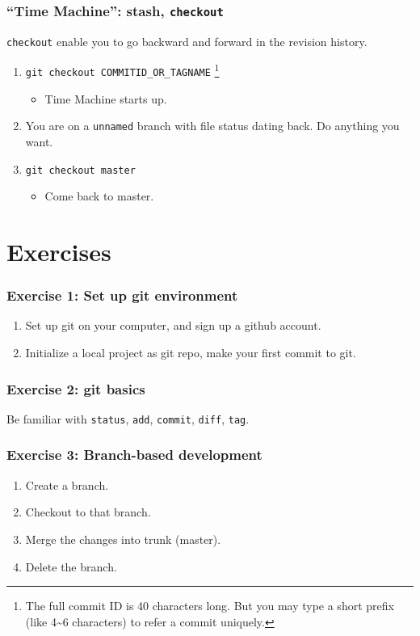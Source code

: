 \documentclass[11pt,ignorenonframetext,]{beamer}
\begin{document}
\begin{frame}[fragile]\frametitle{``Time Machine'': stash,
\texttt{checkout}}

\texttt{checkout} enable you to go backward and forward in the revision
history.

\begin{enumerate}[1.]
\item
  \texttt{git checkout COMMITID\_OR\_TAGNAME} \footnote{The full commit
    ID is 40 characters long. But you may type a short prefix (like
    4\textasciitilde{}6 characters) to refer a commit uniquely.}
  \begin{itemize}
  \item
    Time Machine starts up.
  \end{itemize}
\item
  You are on a \texttt{unnamed} branch with file status dating back. Do
  anything you want.
\item
  \texttt{git checkout master}
  \begin{itemize}
  \item
    Come back to master.
  \end{itemize}
\end{enumerate}
\end{frame}

\section{Exercises}

\begin{frame}[fragile]\frametitle{Exercise 1: Set up git environment}

\begin{enumerate}[1.]
\item
  Set up git on your computer, and sign up a github account.
\item
  Initialize a local project as git repo, make your first commit to git.
\end{enumerate}
\end{frame}

\begin{frame}[fragile]\frametitle{Exercise 2: git basics}

Be familiar with \texttt{status}, \texttt{add}, \texttt{commit},
\texttt{diff}, \texttt{tag}.

\end{frame}

\begin{frame}\frametitle{Exercise 3: Branch-based development}

\begin{enumerate}[1.]
\item
  Create a branch.
\item
  Checkout to that branch.
\item
  Merge the changes into trunk (master).
\item
  Delete the branch.
\end{enumerate}
\end{frame}
\end{document}
